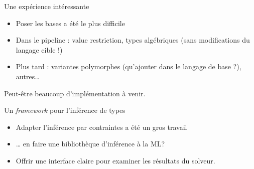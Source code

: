 \documentclass[final]{beamer}
\begin{document}
\begin{frame}{Une expérience intéressante}
  \begin{itemize}
    \item Poser les bases a été le plus difficile
    \item Dans le pipeline : value restriction, types algébriques (sans
      modifications du langage cible !)
    \item Plus tard : variantes polymorphes (qu'ajouter dans le langage de
      base ?), autres…
  \end{itemize}

  Peut-être beaucoup d'implémentation à venir.
\end{frame}

\begin{frame}{Un \emph{framework} pour l'inférence de types}
  \begin{itemize}
    \item Adapter l'inférence par contraintes a été un gros travail
    \item … en faire une bibliothèque d'inférence à la ML?
    \item Offrir une interface claire pour examiner les résultats du solveur. 
  \end{itemize}
\end{frame}


{{%
}}
\end{document}
